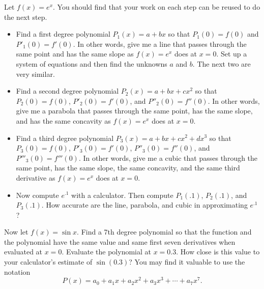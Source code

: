 \begin{problem} 
Let $f(x)=e^x$. You should find that your work on each step can be reused to do the next step.
\begin{itemize}
\item Find a first degree polynomial $P_1(x)=a+bx$ so that $P_1(0)=f(0)$ and $P'_1(0)=f'(0)$. In other words, give me a line that passes through the same point and has the same slope as $f(x)=e^x$ does at $x=0$. Set up a system of equations and then find the unknowns $a$ and $b$. The next two are very similar.
\item Find a second degree polynomial $P_2(x)=a+bx+cx^2$ so that $P_2(0)=f(0)$, $P'_2(0)=f'(0)$, and $P''_2(0)=f''(0)$. In other words, give me a parabola that passes through the same point, has the same slope, and has the same concavity as $f(x)=e^x$ does at $x=0$. 
\item Find a third degree polynomial $P_3(x)=a+bx+cx^2+dx^3$ so that $P_3(0)=f(0)$, $P'_3(0)=f'(0)$, $P''_3(0)=f''(0)$, and $P'''_3(0)=f'''(0)$. In other words, give me a cubic that passes through the same point, has the same slope, the same concavity, and the same third derivative as $f(x)=e^x$ does at $x=0$. 
\item Now compute $e^{.1}$ with a calculator.  Then compute $P_1(.1)$, $P_2(.1)$, and $P_3(.1)$. How accurate are the line, parabola, and cubic in approximating $e^{.1}$?
\end{itemize}
\end{problem} 



\begin{problem} 
Now let $f(x)=\sin x$. Find a 7th degree polynomial so that the function and the polynomial have the same value and same first seven derivatives when evaluated at $x=0$. Evaluate the polynomial at $x=0.3$. How close is this value to your calculator's estimate of $\sin(0.3)$?  You may find it valuable to use the notation $$P(x) = a_0+a_1x+a_2x^2+a_3x^3 +\cdots+a_7 x^7.$$
\end{problem}




